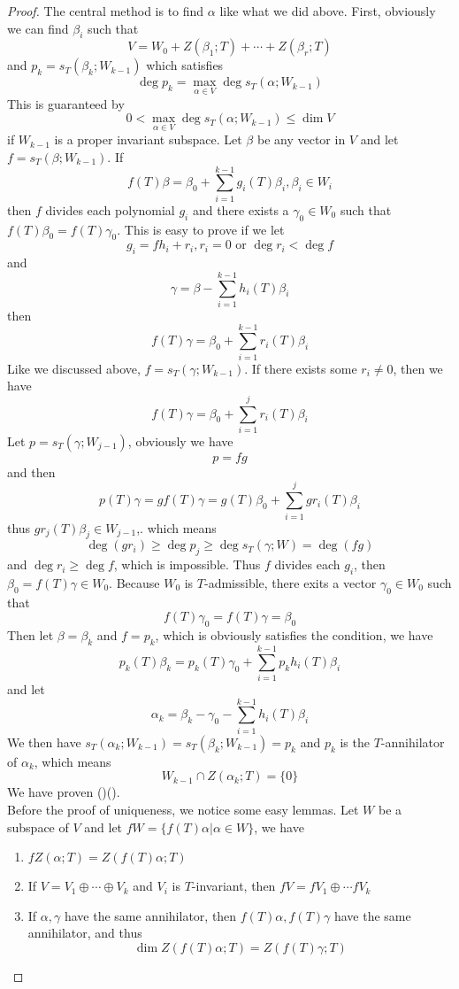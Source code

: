 \documentclass{article}
\begin{document}
\begin{proof}
	The central method is to find $\alpha$ like what we did above. First, obviously we can find $\beta_i$ such that
	\[V=W_0+Z(\beta_1;T)+\cdots+Z(\beta_r;T)\]
	and $p_k=s_T(\beta_k;W_{k-1})$ which satisfies
	\[\deg p_k=\max\limits_{\alpha\in V}\deg s_T(\alpha;W_{k-1})\]
	This is guaranteed by
	\[0<\max_{\alpha\in V}\deg s_T(\alpha;W_{k-1})\le\dim V\]
	if $W_{k-1}$ is a proper invariant subspace. Let $\beta$ be any vector in $V$ and let $f=s_T(\beta;W_{k-1})$. If
	\[f(T)\beta=\beta_0+\sum_{i=1}^{k-1}g_i(T)\beta_i,\beta_i\in W_i\]
	then $f$ divides each polynomial $g_i$ and there exists a $\gamma_0\in W_0$ such that $f(T)\beta_0=f(T)\gamma_0$. This is easy to prove if we let
	\[g_i=fh_i+r_i,r_i=0\text{ or }\deg r_i<\deg f\]
	and 
	\[\gamma=\beta-\sum_{i=1}^{k-1}h_i(T)\beta_i\]
	then
	\[f(T)\gamma=\beta_0+\sum_{i=1}^{k-1}r_i(T)\beta_i\]
	Like we discussed above, $f=s_T(\gamma;W_{k-1})$. If there exists some $r_i\neq0$, then we have
	\[f(T)\gamma=\beta_0+\sum_{i=1}^{j}r_i(T)\beta_i\]
	Let $p=s_T(\gamma;W_{j-1})$, obviously we have
	\[p=fg\]
	and then
	\[p(T)\gamma=gf(T)\gamma=g(T)\beta_0+\sum_{i=1}^{j}gr_i(T)\beta_i\]
	thus $gr_j(T)\beta_j\in W_{j-1}$,. which means
	\[\deg(gr_i)\ge\deg p_j\ge\deg s_T(\gamma;W)=\deg(fg)\]
	and $\deg r_i\ge\deg f$, which is impossible. Thus $f$ divides each $g_i$, then $\beta_0=f(T)\gamma\in W_0$. Because $W_0$ is $T$-admissible, there exits a vector $\gamma_0\in W_0$ such that
	\[f(T)\gamma_0=f(T)\gamma=\beta_0\]
	Then let $\beta=\beta_k$ and $f=p_k$, which is obviously satisfies the condition, we have
	\[p_k(T)\beta_k=p_k(T)\gamma_0+\sum_{i=1}^{k-1}p_kh_i(T)\beta_i\]
	and let
	\[\alpha_k=\beta_k-\gamma_0-\sum_{i=1}^{k-1}h_i(T)\beta_i\]
	We then have $s_T(\alpha_k;W_{k-1})=s_T(\beta_k;W_{k-1})=p_k$ and $p_k$ is the $T$-annihilator of $\alpha_k$, which means
	\[W_{k-1}\cap Z(\alpha_k;T)=\{0\}\]
	We have proven ()().\\
	Before the proof of uniqueness, we notice some easy lemmas. Let $W$ be a subspace of $V$ and let $fW=\{f(T)\alpha|\alpha\in W\}$, we have
	\begin{enumerate}
		\item $fZ(\alpha;T)=Z(f(T)\alpha;T)$
		\item If $V=V_1\oplus\cdots\oplus V_k$ and $V_i$ is $T$-invariant, then $fV=fV_1\oplus\cdots fV_k$
		\item If $\alpha,\gamma$ have the same annihilator, then $f(T)\alpha,f(T)\gamma$ have the same annihilator, and thus
		\[\dim Z(f(T)\alpha;T)=Z(f(T)\gamma;T)\]

\end{enumerate}
\end{proof}
\end{document}
